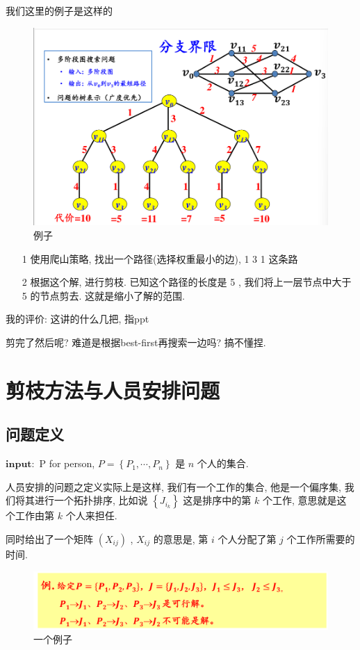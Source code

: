 \documentclass[a4paper, 10pt]{ctexbook} %
\begin{document}
我们这里的例子是这样的
\begin{figure}[H]
    \centering
    \includegraphics[scale=0.5]{ss1.png}
    \caption{例子}
\end{figure}
\begin{itemize}
    \item[1] 使用爬山策略, 找出一个路径(选择权重最小的边), 1 3 1 这条路
    \item[2] 根据这个解, 进行剪枝. 已知这个路径的长度是 5 , 我们将上一层节点中大于 5 的节点剪去. 这就是缩小了解的范围.  
\end{itemize}

我的评价: 这讲的什么几把, 指ppt 

剪完了然后呢? 难道是根据best-first再搜索一边吗? 
搞不懂捏. 
\chapter{剪枝方法与人员安排问题}
\section{问题定义}

$\mathbf{input}:$ P for person, $P = \left\{P_1 , \cdots  , P_n\right\}$ 是 $n$ 个人的集合. 

人员安排的问题之定义实际上是这样, 我们有一个工作的集合, 他是一个偏序集, 我们将其进行一个拓扑排序, 
比如说 $\left\{J_{i_{k}}\right\}$ 这是排序中的第 $k$ 个工作, 意思就是这个工作由第 $k$ 个人来担任. 

同时给出了一个矩阵 $\left(X_{ij}\right)$ , $X_{ij}$ 的意思是, 第 $i$ 个人分配了第 $j$ 个工作所需要的时间. 

\begin{figure}[H]
    \centering
    \includegraphics[scale = 0.5]{ss2.png}
    \caption{一个例子}
\end{figure}
\end{document}
